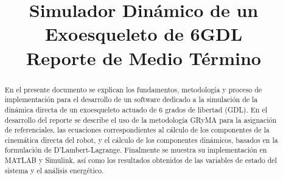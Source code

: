 \documentclass[journal]{IEEEtran}
\begin{document}
    \title{Simulador Dinámico de un Exoesqueleto de 6GDL\\
    \small{Reporte de Medio Término}}

    \author{
    }

    \maketitle


    \begin{abstract}
        En el presente documento se explican los fundamentos, metodología y proceso de implementación 
        para el desarrollo de un software dedicado a la simulación de la dinámica directa de un 
        exoesqueleto actuado de 6 grados de libertad (GDL). En el desarrollo del reporte se describe 
        el uso de la metodología GRyMA para la asignación de referenciales, las ecuaciones correspondientes 
        al cálculo de los componentes de la cinemática directa del robot, y el cálculo de los componentes 
        dinámicos, basados en la formulación de D'Lambert-Lagrange. Finalmente se muestra su implementación en 
        MATLAB y Simulink, así como los resultados obtenidos de las variables de estado del sistema y el análisis 
        energético.
    \end{abstract}
\end{document}

